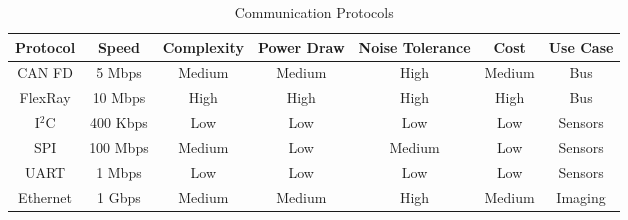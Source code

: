 \begin{table}[h]
\centering
\begin{tabular}{|c|c|c|c|c|c|c|} 
\hline
\textbf{Protocol} & \textbf{Speed} & \textbf{Complexity} & \textbf{Power Draw} & \textbf{Noise Tolerance} & \textbf{Cost} & \textbf{Use Case} \\ 
\hline 
CAN FD & 5 Mbps & Medium & Medium & High & Medium & Bus \\ 
FlexRay & 10 Mbps & High & High & High & High & Bus \\ 
I$^2$C & 400 Kbps & Low & Low & Low & Low & Sensors \\ 
SPI & 100 Mbps & Medium & Low & Medium & Low & Sensors \\ 
UART & 1 Mbps & Low & Low & Low & Low & Sensors \\ 
Ethernet & 1 Gbps & Medium & Medium & High & Medium & Imaging \\ 
\hline 
\end{tabular}
\caption{Communication Protocols}
\label{tab:communication_options}
\end{table}